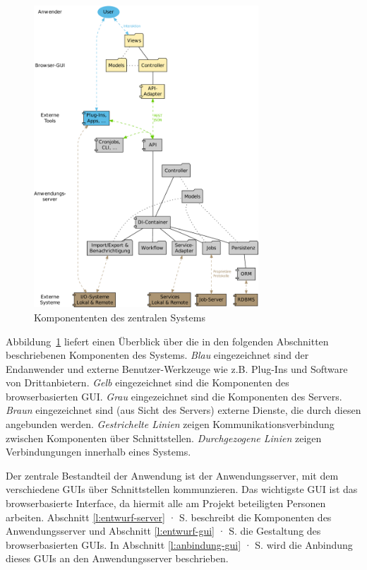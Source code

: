 \begin{figure}[htb]
\begin{center}
\includegraphics[width=0.75\textwidth]{media/komponenten.pdf}
\end{center}
\caption{Komponententen des zentralen Systems}
\label{chart:komponenten}
\end{figure}

Abbildung~\ref{chart:komponenten} liefert einen Überblick über die in den folgenden Abschnitten beschriebenen Komponenten des Systems. \emph{Blau} eingezeichnet sind der Endanwender und externe Benutzer-Werkzeuge wie z.B. Plug-Ins und Software von Drittanbietern. \emph{Gelb} eingezeichnet sind die Komponenten des browserbasierten GUI. \emph{Grau} eingezeichnet sind die Komponenten des Servers. \emph{Braun} eingezeichnet sind (aus Sicht des Servers) externe Dienste, die durch diesen angebunden werden. \emph{Gestrichelte Linien} zeigen Kommunikationsverbindung zwischen Komponenten über Schnittstellen. \emph{Durchgezogene Linien} zeigen Verbindungungen innerhalb eines Systems. 

Der zentrale Bestandteil der Anwendung ist der Anwendungsserver, mit dem verschiedene GUIs über Schnittstellen kommunzieren. Das wichtigste GUI ist das browserbasierte Interface, da hiermit alle am Projekt beteiligten Personen arbeiten. Abschnitt \ref{l:entwurf-server} · S.\pageref{l:entwurf-server} beschreibt die Komponenten des Anwendungsserver und Abschnitt \ref{l:entwurf-gui} · S.\pageref{l:entwurf-gui} die Gestaltung des browserbasierten GUIs. In Abschnitt \ref{l:anbindung-gui} · S.\pageref{l:anbindung-gui} wird die Anbindung dieses GUIs an den Anwendungsserver beschrieben.

